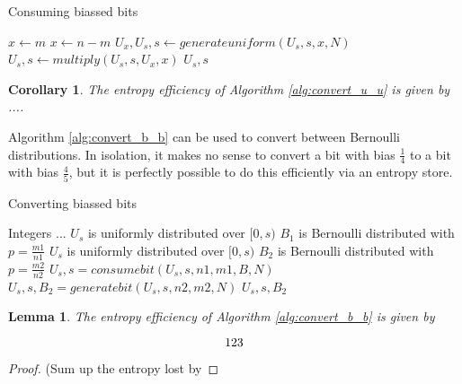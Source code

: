 \documentclass[12pt]{article}
\newtheorem{lemma}{Lemma}
\newtheorem{corollary}{Corollary}
\begin{document}
\begin{algorithm}
\caption{Consuming biassed bits}
\label{alg:consume_b}
\begin{algorithmic}[1]
        \State $x \gets m$
    \Else
        \State $x \gets n-m$
    \EndIf
    \State $U_x, U_s, s \gets generateuniform(U_s, s, x, N)$
    \State $U_s, s \gets multiply(U_s, s, U_x, x)$
    \State \Return $U_s, s$
\EndProcedure
\end{algorithmic}
\end{algorithm}

\begin{corollary}
The entropy efficiency of Algorithm \ref{alg:convert_u_u} is given by ....
\end{corollary}

Algorithm \ref{alg:convert_b_b} can be used to convert between Bernoulli distributions. In isolation, it makes no sense to convert a bit with bias $\frac{1}{4}$ to a bit with bias $\frac{4}{5}$, but it is perfectly possible to do this efficiently via an entropy store.

\begin{algorithm}
\caption{Converting biassed bits}
\label{alg:convert_b_b}
\begin{algorithmic}[1]
    \Require Integers ...
    \Require $U_s$ is uniformly distributed over $[0,s)$
    \Require $B_1$ is Bernoulli distributed with $p=\frac{m1}{n1}$
    \Ensure $U_s$ is uniformly distributed over $[0,s)$
    \Ensure $B_2$ is Bernoulli distributed with $p=\frac{m2}{n2}$
    \State $U_s, s = consumebit(U_s, s, n1, m1, B, N)$
    \State $U_s, s, B_2 = generatebit(U_s, s, n2, m2, N)$
    \State \Return $U_s, s, B_2$
\EndProcedure
\end{algorithmic}
\end{algorithm}

\begin{lemma}
The entropy efficiency of Algorithm \ref{alg:convert_b_b} is given by 

\begin{equation}
$$123$$
\end{equation}

\end{lemma}

\begin{proof}
(Sum up the entropy lost by 

\end{proof}
\end{document}
